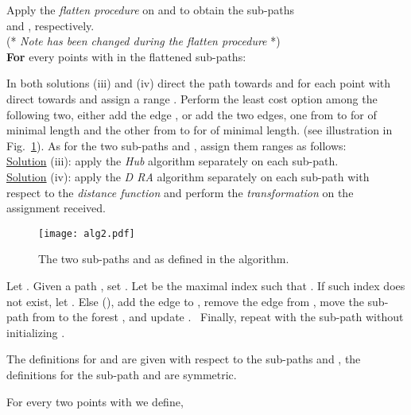 \documentclass[a4paper]{article}
\newenvironment{indentpar}[1]{
 \begin{list}{}{\setlength{\leftmargin}{#1}
         \setlist{nolistsep} }\item[]}
 {\end{list}}
\begin{document}
\begin{algorithm}[htp]
\begin{algorithmic}
\begin{indentpar}{0.4cm}
Apply the \emph{flatten procedure}  on  and  to obtain the sub-paths\\
 and , respectively.\\ 
			(* \textit{Note  has been changed during the \emph{flatten procedure}} *)\\
			\textbf{For} every  points 
			with  in the flattened sub-paths:
\begin{indentpar}{0.6cm}
	          In both solutions (iii) and (iv) direct the path  towards  
		        and for each point  with  direct  towards  and assign  a range .		
						Perform the least cost option among the following two, either 
						add the edge , or add the two edges, 
						one from  to  for  of minimal length
						and the other from  to  for  of minimal length.
						(see illustration in Fig.~\ref{fig:alg2}).
As for the two sub-paths  and ,
						assign them ranges as follows:\vspace{0.1cm} \\
\underline{Solution} (iii): apply the \emph{Hub} algorithm separately on each sub-path.\\ 
						\underline{Solution} (iv): apply the \emph{D RA} algorithm separately on each sub-path 
						with respect to the \emph{distance function }
						and perform the \emph{transformation } on the assignment received.
			\end{indentpar}
\end{indentpar}
 
\begin{figure}[bht]
    \centering
        \texttt{[image: alg2.pdf]}
    \caption{The two sub-paths  and  as defined in the algorithm.}
    \label{fig:alg2}
\end{figure}


\begin{description}[topsep=0.2cm, itemsep=0.1cm]

\item[The \emph{flatten} procedure .]
Let . Given a path , set . Let  be the maximal index such that .
If such index does not exist, let .
Else (), add the edge  to , remove the edge  from , 
move the sub-path  from  to the forest , 
and update . \
Finally, repeat with the sub-path  without initializing .
\end{description}




The definitions for  and  are given with respect to
the sub-paths  and , the definitions for the sub-path  and  are symmetric.
\begin{description}[topsep=0.2cm, itemsep=0.1cm]
\item[The distance function .]
For every two points  with  we define,



\end{description}
\end{algorithmic}
\end{algorithm}
\end{document}
